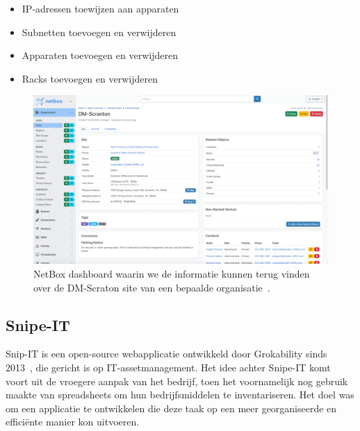 \begin{itemize}
    \item IP-adressen toewijzen aan apparaten
    \item Subnetten toevoegen en verwijderen
    \item Apparaten toevoegen en verwijderen
    \item Racks toevoegen en verwijderen
\end{itemize}

\begin{figure}[h!]
    \includegraphics[width=\textwidth]
    {./graphics/state-of-the-art/netbox-dashboard.png}
    \caption{\label{fig:netbox-dashboard}NetBox dashboard waarin we de informatie kunnen terug vinden over de DM-Scraton site van een bepaalde organisatie~\autocite{netbox-dashboard}.}
\end{figure}

\subsection{Snipe-IT}
\label{sub:snipe-it}

Snip-IT is een open-source webapplicatie ontwikkeld door Grokability sinds 2013~\autocite{snipe-it-introduction}, die gericht is op IT-assetmanagement.
Het idee achter Snipe-IT komt voort uit de vroegere aanpak van het bedrijf, toen het voornamelijk nog gebruik maakte van spreadsheets om hun bedrijfsmiddelen te inventariseren.
Het doel was om een applicatie te ontwikkelen die deze taak op een meer georganiseerde en effici\"ente manier kon uitvoeren.

